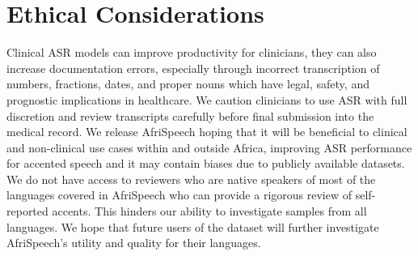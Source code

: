\documentclass[11pt,a4paper]{article}
\begin{document}


\section{Ethical Considerations}

Clinical ASR models can improve productivity for clinicians, they can also increase documentation errors, especially through incorrect transcription of numbers, fractions, dates, and proper nouns which have legal, safety, and prognostic implications in healthcare. 
We caution clinicians to use ASR with full discretion and review transcripts carefully before final submission into the medical record. We release AfriSpeech hoping that it will be beneficial to clinical and non-clinical use cases within and outside Africa, improving ASR performance for accented speech and it may contain biases due to publicly available datasets. 
We do not have access to reviewers who are native speakers of most of the languages covered in AfriSpeech who can provide a rigorous review of self-reported accents. This hinders our ability to investigate samples from all languages. We hope that future users of the dataset will further investigate AfriSpeech's utility and quality for their languages.
\end{document}
